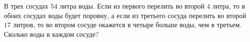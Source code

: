 \begin{ex}
	\begin{condition}
		В трех сосудах \( 54 \) литра воды. Если из первого перелить во второй \( 4 \) литра, то в обоих сосудах воды будет поровну, а если из третьего сосуда перелить во второй \( 17 \) литров, то во втором сосуде окажется в четыре больше воды, чем в третьем. Сколько воды в каждом сосуде?
	\end{condition}
\end{ex}